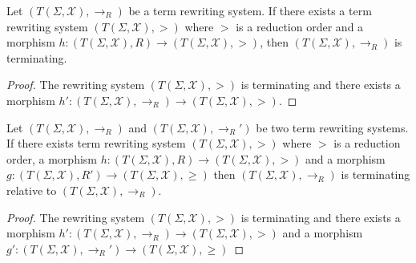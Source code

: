 \begin{theorem}
    Let $(T(\Sigma,\mathcal{X}), \mathop{\to} _R)$ be a term rewriting system. If there exists a term rewriting system $(T(\Sigma,\mathcal{X}),>)$ where $>$ is a reduction order and a morphism $h:(T(\Sigma,\mathcal{X}),R) \mathop{\to} (T(\Sigma,\mathcal{X}),>)$, then $(T(\Sigma,\mathcal{X}), \mathop{\to} _R)$ is terminating.
  \end{theorem}
  \begin{proof}
    The rewriting system $(T(\Sigma,\mathcal{X}),>)$ is terminating and there exists a morphism $h':(T(\Sigma,\mathcal{X}),\to_R) \mathop{\to} (T(\Sigma,\mathcal{X}),>)$.
  \end{proof}
  
  \begin{theorem}
    Let $(T(\Sigma,\mathcal{X}), \mathop{\to} _R)$ and $(T(\Sigma,\mathcal{X}), \mathop{\to} _R')$ be two term rewriting systems. If there exists term rewriting system $(T(\Sigma,\mathcal{X}), >)$ where $>$ is a reduction order, a morphism $h: (T(\Sigma,\mathcal{X}),R) \mathop{\to} (T(\Sigma,\mathcal{X}), >)$ and a morphism $g: (T(\Sigma,\mathcal{X}),R') \mathop{\to} (T(\Sigma,\mathcal{X}), \mathop{\geq})$ then 
     $(T(\Sigma,\mathcal{X}), \mathop{\to} _R)$ is terminating relative to $(T(\Sigma,\mathcal{X}), \mathop{\to} _R)$.
  \end{theorem}
  \begin{proof}
    The rewriting system $(T(\Sigma,\mathcal{X}),>)$ is terminating and there exists a morphism $h':(T(\Sigma,\mathcal{X}),\to_R) \mathop{\to} (T(\Sigma,\mathcal{X}),>)$ and a morphism $g':(T(\Sigma,\mathcal{X}),\to_R') \mathop{\to} (T(\Sigma,\mathcal{X}),\geq)$
  \end{proof}